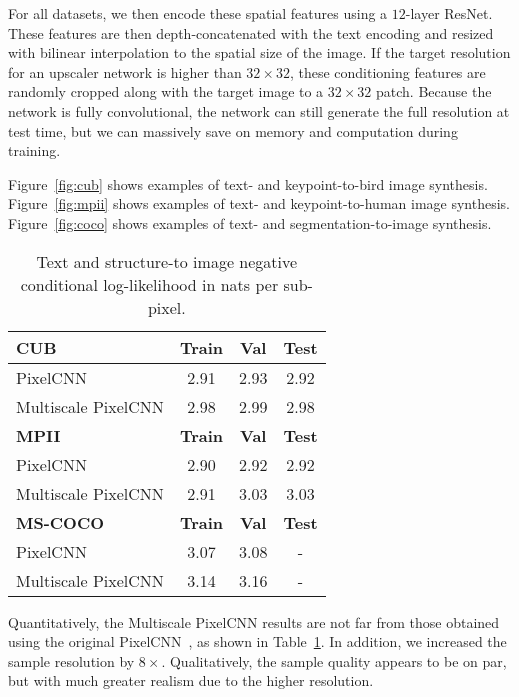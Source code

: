 \documentclass{article}
\begin{document}
For all datasets, we then encode these spatial features using a $12$-layer ResNet.
These features are then depth-concatenated with the text encoding and resized with bilinear interpolation to the spatial size of the image.
If the target resolution for an upscaler network is higher than $32 \times 32$, these conditioning features are randomly cropped along with the target image to a $32 \times 32$ patch.
Because the network is fully convolutional, the network can still generate the full resolution at test time, but we can massively save on memory and computation during training.

Figure~\ref{fig:cub} shows examples of text- and keypoint-to-bird image synthesis.
Figure~\ref{fig:mpii} shows examples of text- and keypoint-to-human image synthesis.
Figure~\ref{fig:coco} shows examples of text- and segmentation-to-image synthesis.



\begin{table}[h!]
\begin{center}
\begin{tabular}{| l | c | c | c |}
\hline
\textbf{CUB} & \textbf{Train} & \textbf{Val} & \textbf{Test} \\
\hline
\hline
PixelCNN & 2.91  & 2.93 & 2.92 \\ \hline
Multiscale PixelCNN & 2.98 & 2.99 & 2.98 \\ 
\hline
\hline
\textbf{MPII} & \textbf{Train} & \textbf{Val} & \textbf{Test} \\ \hline
PixelCNN & 2.90 & 2.92 & 2.92 \\ \hline
Multiscale PixelCNN & 2.91 & 3.03 & 3.03 \\ 
\hline
\hline
\textbf{MS-COCO} & \textbf{Train} & \textbf{Val} & \textbf{Test} \\ \hline
PixelCNN & 3.07 & 3.08 & - \\ \hline
Multiscale PixelCNN & 3.14 & 3.16 & - \\ 
\hline
\end{tabular}
\vspace{-0.1in}
\end{center}
\vspace{-0.05in}
\caption{Text and structure-to image negative conditional log-likelihood in nats per sub-pixel.\label{tab:txt2img}}
\vspace{-0.3in}
\end{table}
Quantitatively, the Multiscale PixelCNN results are not far from those obtained using the original PixelCNN~\citep{reed2016generating}, as shown in Table~\ref{tab:txt2img}.
In addition, we increased the sample resolution by $8\times$.
Qualitatively, the sample quality appears to be on par, but with much greater realism due to the higher resolution.
\end{document}

